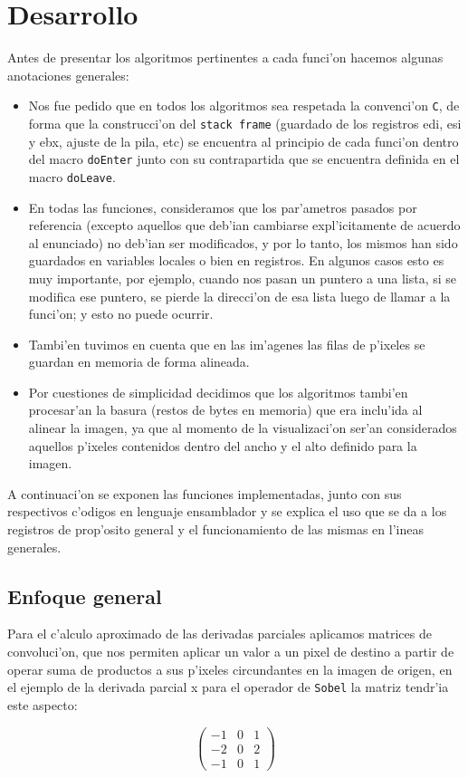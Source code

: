 \documentclass[11pt]{article}
\begin{document}
\section{Desarrollo}
Antes de presentar los algoritmos pertinentes a cada funci'on hacemos algunas anotaciones generales:
\begin{itemize}
\item Nos fue pedido que en todos los algoritmos sea respetada la convenci'on \verb'C', de forma que la construcci'on del \verb'stack frame' (guardado de los registros edi, esi y ebx, ajuste de la pila, etc) se encuentra al principio de cada funci'on dentro del macro \verb'doEnter' junto con su contrapartida que se encuentra definida en el macro \verb'doLeave'.
\item En todas las funciones, consideramos que los par'ametros pasados por referencia (excepto aquellos que deb'ian cambiarse expl'icitamente de acuerdo al enunciado) no deb'ian ser modificados, y por lo tanto, los mismos han sido guardados en variables locales o bien en registros. En algunos casos esto es muy importante, por ejemplo, cuando nos pasan un puntero a una lista, si se modifica ese puntero, se pierde la direcci'on de esa lista luego de llamar a la funci'on; y esto no puede ocurrir.
\item Tambi'en tuvimos en cuenta que en las im'agenes las filas de p'ixeles se guardan en memoria de forma alineada.
\item Por cuestiones de simplicidad decidimos que los algoritmos tambi'en procesar'an la basura (restos de bytes en memoria) que era inclu'ida al alinear la imagen, ya que al momento de la visualizaci'on ser'an considerados aquellos p'ixeles contenidos dentro del ancho y el alto definido para la imagen.
\end{itemize}
A continuaci'on se exponen las funciones implementadas, junto con sus respectivos c'odigos en lenguaje ensamblador y se explica el uso que se da a los registros de prop'osito general y el funcionamiento de las mismas en l'ineas generales.
\subsection{Enfoque general}
Para el c'alculo aproximado de las derivadas parciales aplicamos matrices de convoluci'on, que nos permiten aplicar un valor a un pixel de destino a partir de operar suma de productos a sus p'ixeles circundantes en la imagen de origen, en el ejemplo de la derivada parcial x para el operador de \verb'Sobel' la matriz tendr'ia este aspecto:
\begin{center}
\begin{minipage}{5in}
\[ \left( \begin{array}{ccc}
-1 & 0 & 1 \\
-2 & 0 & 2 \\
-1 & 0 & 1 \end{array} \right)\]
\end{minipage}
\end{center}
\end{document}
